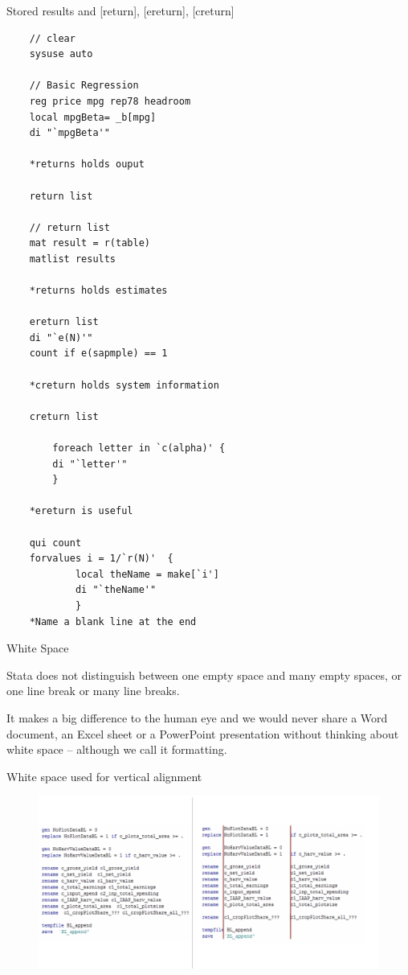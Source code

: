 \documentclass[aspectratio=169]{beamer}
\begin{document}
\begin{frame}[fragile]{Stored results and [return], [ereturn], [creturn]}
\begin{multicols}{2}
	\begin{lstlisting}
	// clear
	sysuse auto
	
	// Basic Regression
	reg price mpg rep78 headroom
	local mpgBeta= _b[mpg]
	di "`mpgBeta'"
	
	*returns holds ouput
	
	return list
	
	// return list
	mat result = r(table)
	matlist results 
	
	*returns holds estimates
	
	ereturn list
	di "`e(N)'"
	count if e(sapmple) == 1
	
	*creturn holds system information
	
	creturn list 
	
		foreach letter in `c(alpha)' {
		di "`letter'" 
		}
		
	*ereturn is useful
	
	qui count
	forvalues i = 1/`r(N)' 	{
			local theName = make[`i']
			di "`theName'"
			}
	*Name a blank line at the end
	\end{lstlisting}

\end{multicols}
\end{frame}



\begin{frame}{White Space}

	\leavevmode 	\newline Stata does not distinguish between one empty space and many empty spaces, or one line break or many line breaks.
	
	\leavevmode 	\newline It makes a big difference to the human eye and we would never share a Word document, an Excel sheet or a PowerPoint presentation without thinking about white space – although we call it formatting.

\end{frame}


\begin{frame}{White space used for vertical alignment}

	\begin{figure}
		\centering
		\includegraphics[width=\linewidth]{img/White_space}
	\end{figure}

\end{frame}
\end{document}
